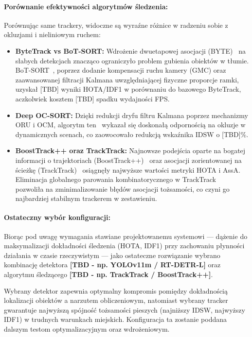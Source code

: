 \paragraph{Porównanie efektywności algorytmów śledzenia:}
Porównując same trackery, widoczne są wyraźne różnice w radzeniu sobie z okluzjami i nieliniowym
ruchem:
\begin{itemize}
  \item \textbf{ByteTrack vs BoT-SORT:} Wdrożenie dwuetapowej asocjacji (BYTE)~\cite{bytetrack} na słabych detekcjach znacząco ograniczyło problem gubienia obiektów w tłumie. BoT-SORT~\cite{bot-sort}, poprzez dodanie kompensacji ruchu kamery (GMC) oraz zaawansowanej filtracji Kalmana uwzględniającej fizyczne proporcje ramki, uzyskał [TBD] wyniki HOTA/IDF1 w porównaniu do bazowego ByteTrack, aczkolwiek kosztem [TBD] spadku wydajności FPS.
  \item \textbf{Deep OC-SORT:} Dzięki redukcji dryfu filtru Kalmana poprzez mechanizmy ORU i OCM, algorytm ten~\cite{cao2023ocsort,maggiolino2023deepocsort} wykazał się doskonałą odpornością na okluzje w dynamicznych scenach, co zaowocowało redukcją wskaźnika IDSW o [TBD]\%.
  \item \textbf{BoostTrack++ oraz TrackTrack:} Najnowsze podejścia oparte na bogatej informacji o trajektoriach (BoostTrack++)~\cite{stanojevic2024boosttrackpp} oraz asocjacji zorientowanej na ścieżkę (TrackTrack)~\cite{shim2025tracktrack} osiągnęły najwyższe wartości metryki HOTA i AssA. Eliminacja globalnego parowania kombinatorycznego w TrackTrack~\cite{shim2025tracktrack} pozwoliła na zminimalizowanie błędów asocjacji tożsamości, co czyni go najbardziej stabilnym trackerem w zestawieniu.
\end{itemize}

\paragraph{Ostateczny wybór konfiguracji:}
Biorąc pod uwagę wymagania stawiane projektowanemu systemowi --- dążenie do maksymalizacji
dokładności śledzenia (HOTA, IDF1) przy zachowaniu płynności działania w czasie rzeczywistym ---
jako ostateczne rozwiązanie wybrano kombinację detektora \textbf{[TBD - np. YOLOv11m / RT-DETR-L]}
oraz algorytmu śledzącego \textbf{[TBD - np. TrackTrack / BoostTrack++]}.

Wybrany detektor zapewnia optymalny kompromis pomiędzy dokładnością lokalizacji obiektów a narzutem
obliczeniowym, natomiast wybrany tracker gwarantuje najwyższą spójność tożsamości pieszych
(najniższy IDSW, najwyższy IDF1) w trudnych warunkach miejskich. Konfiguracja ta zostanie poddana
dalszym testom optymalizacyjnym oraz wdrożeniowym.

